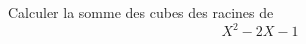 Calculer la somme des cubes des racines de
\begin{displaymath}
 X^2-2X-1
\end{displaymath}
\bigskip
